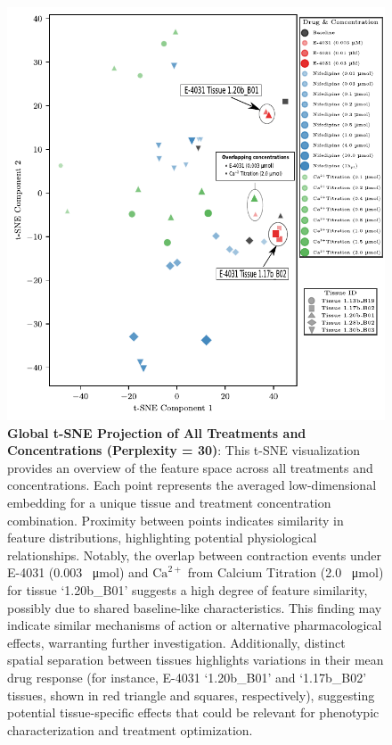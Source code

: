\documentclass{report}
\begin{document}
        \begin{figure}[H]
            \centering
            \includegraphics[width=1\textwidth, height=0.62\textheight,keepaspectratio]{plots/chapter_4/drug_wise_global_tsne_averaged_annotaed_2.pdf}
            \caption[Global t-SNE Projection of All Treatments and Concentrations (Perplexity = 30)]{
                \textbf{Global t-SNE Projection of All Treatments and Concentrations (Perplexity = 30)}:  
                This t-SNE visualization provides an overview of the feature space across all treatments and concentrations. Each point represents the averaged low-dimensional embedding for a unique tissue and treatment concentration combination. Proximity between points indicates similarity in feature distributions, highlighting potential physiological relationships. Notably, the overlap between contraction events under E-4031 (0.003  \SI{}{\umol}) and $\text{Ca}^{2+}$ from Calcium Titration (2.0  \SI{}{\umol}) for tissue `1.20b\_B01' suggests a high degree of feature similarity, possibly due to shared baseline-like characteristics. This finding may indicate similar mechanisms of action or alternative pharmacological effects, warranting further investigation. Additionally, distinct spatial separation between tissues highlights variations in their mean drug response (for instance, E-4031 `1.20b\_B01' and `1.17b\_B02' tissues, shown in red triangle and squares, respectively), suggesting potential tissue-specific effects that could be relevant for phenotypic characterization and treatment optimization.}
            \label{fig:global-tsne}
        \end{figure}
\end{document}
